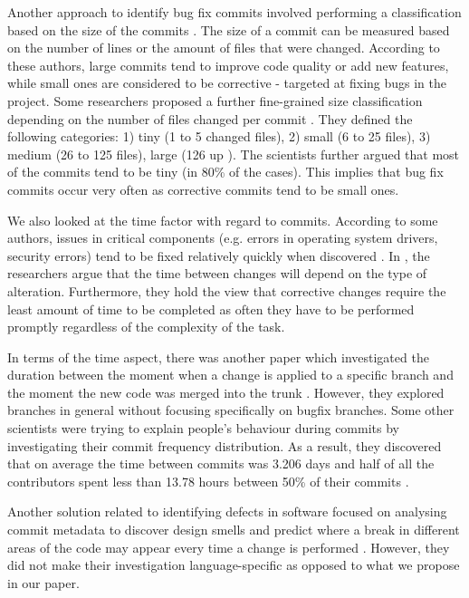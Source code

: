 Another approach to identify bug fix commits involved performing a classification based on the size of the commits \cite{Hattori2008,Mockus2000,Hindle2008}. The size of a commit can be measured based on the number of lines or the amount of files that were changed. According to these authors, large commits tend to improve code quality or add new features, while small ones are considered to be corrective - targeted at fixing bugs in the project. Some researchers proposed a further fine-grained size classification depending on the number of files changed per commit \cite{Hattori2008}. They defined the following categories: 1) tiny (1 to 5 changed files), 2) small (6 to 25 files), 3) medium (26 to 125 files), large (126 up ). The scientists further argued that most of the commits tend to be tiny (in 80\% of the cases). This implies that bug fix commits occur very often as corrective commits tend to be small ones.\par

We also looked at the time factor with regard to commits. According to some authors, issues in critical components (e.g. errors in operating system drivers, security errors) tend to be fixed relatively quickly when discovered \cite{Livshits2005}. In \cite{Mockus2000}, the researchers argue that the time between changes will depend on the type of alteration. Furthermore, they hold the view that corrective changes require the least amount of time to be completed as often they have to be performed promptly regardless of the complexity of the task.\par

In terms of the time aspect, there was another paper which investigated the duration between the moment when a change is applied to a specific branch and the moment the new code was merged into the trunk \cite{Williams2008}. However, they explored branches in general without focusing specifically on bugfix branches. Some other scientists were trying to explain people’s behaviour during commits by investigating their commit frequency distribution. As a result, they discovered that on average the time between commits was 3.206 days and half of all the contributors spent less than 13.78 hours between 50\% of their commits \cite{Kolassa2013}.\par

Another solution related to identifying defects in software focused on analysing commit metadata to discover design smells and predict where a break in different areas of the code may appear every time a change is performed \cite{Oliva2013}. However, they did not make their investigation language-specific as opposed to what we propose in our paper.\par

